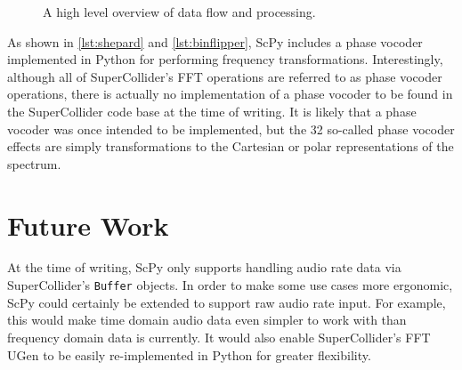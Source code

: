 \documentclass{article}
\begin{document}
\begin{figure}[ht]
    \caption{A high level overview of data flow and processing.}
    \begin{center}
    \end{center}
\end{figure}

As shown in \autoref{lst:shepard} and \autoref{lst:binflipper}, ScPy includes a phase vocoder
implemented in Python for performing frequency transformations. Interestingly, although all of
SuperCollider's FFT operations are referred to as phase vocoder operations, there is actually no
implementation of a phase vocoder to be found in the SuperCollider code base at the time of
writing. It is likely that a phase vocoder was once intended to be implemented, but the 32
so-called phase vocoder effects are simply transformations to the Cartesian or polar
representations of the spectrum.

\section{Future Work}

At the time of writing, ScPy only supports handling audio rate data via SuperCollider's
\texttt{Buffer} objects. In order to make some use cases more ergonomic, ScPy could certainly be
extended to support raw audio rate input. For example, this would make time domain audio data even
simpler to work with than frequency domain data is currently. It would also enable SuperCollider's
FFT UGen to be easily re-implemented in Python for greater flexibility.
\end{document}
